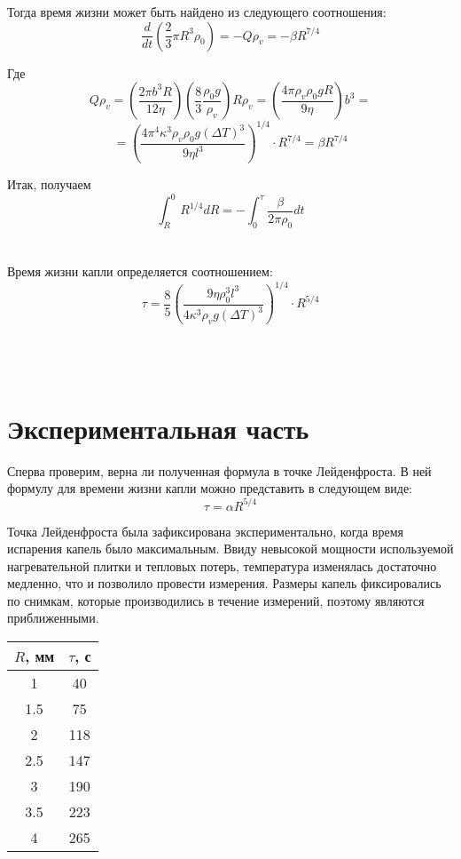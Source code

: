 \documentclass[14 pt]{extreport}
\def\cd{\cdot}
\begin{document}
	Тогда время жизни может быть найдено из следующего соотношения:
	\[\dfrac{d}{dt}\left( \dfrac{2}{3}\pi R^{3}\rho_{0} \right) = -Q\rho_{v} = -\beta R^{7/4}\]
	
	Где
	\[Q\rho_{v} = \left( \dfrac{2\pi b^{3}R}{12\eta} \right) \left( \dfrac{8}{3}\dfrac{\rho_{0}g}{\rho_{v}} \right) R \rho_{v}
	 = \left( \dfrac{4\pi \rho_{v} \rho_{0} g R}{9\eta} \right)b^{3} =  \]
	 \[= \left(\dfrac{4\pi^{4}\kappa^{3}\rho_{v} \rho_{0} g (\varDelta T)^{3}}{9\eta l^{3}}\right)^{1/4} \cd R^{7/4} 
	 = \beta R^{7/4} \]
	 
	 Итак, получаем
	 \[\int_{R}^{0}R^{1/4}dR = -\int_{0}^{\tau}\dfrac{\beta}{2\pi \rho_{0}}dt\]\\\\
	 
	 Время жизни капли определяется соотношением:
	 \[\tau = \dfrac{8}{5}\left( \dfrac{9\eta \rho_{0}^{3}l^{3}}{4\kappa^{3} \rho_{v} g (\varDelta T)^{3}} \right)^{1/4}\cd R^{5/4} \]\\\\\\
	 
	 
	 \section*{Экспериментальная часть}
	 
	 Сперва проверим, верна ли полученная формула в точке Лейденфроста. В ней формулу для времени жизни капли можно представить в следующем виде:
	 \[\tau = \alpha R^{5/4}\]
	 
	 Точка Лейденфроста была зафиксирована экспериментально, когда время испарения капель было максимальным. Ввиду невысокой мощности используемой нагревательной плитки и тепловых потерь, температура изменялась достаточно медленно, что и позволило провести измерения. Размеры капель фиксировались по снимкам, которые производились в течение измерений, поэтому являются приближенными. 
	 
	 \begin{tabular} {| c | c |}
	 	\hline
	 	$R$, мм & $ \tau $, с\\ \hline 
	 	1 & 40 \\ \hline 
	 	1.5 & 75 \\ \hline 
	 	2 & 118 \\ \hline 
	 	2.5 & 147 \\ \hline 
	 	3 & 190  \\ \hline 
	 	3.5 & 223 \\ \hline 
	 	4 & 265 \\ \hline 
	 \end{tabular}
 
\end{document}
